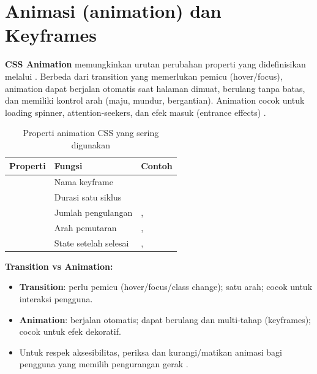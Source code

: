 ﻿\section{Animasi (animation) dan Keyframes}

\textbf{CSS Animation} memungkinkan urutan perubahan properti yang didefinisikan melalui . Berbeda dari transition yang memerlukan pemicu (hover/focus), animation dapat berjalan otomatis saat halaman dimuat, berulang tanpa batas, dan memiliki kontrol arah (maju, mundur, bergantian). Animation cocok untuk loading spinner, attention-seekers, dan efek masuk (entrance effects) \cite{mdnCss}.


\begin{table}[H]
\centering
\footnotesize
\setlength{\tabcolsep}{3pt}
\begin{tabular}{|P{5.8cm}|P{3.25cm}|P{3.25cm}|}
\hline
\textbf{Properti} & \textbf{Fungsi} & \textbf{Contoh} \\
\hline
{} & Nama keyframe &  \\
\hline
{} & Durasi satu siklus &  \\
\hline
{} & Jumlah pengulangan & ,  \\
\hline
{} & Arah pemutaran & ,  \\
\hline
{} & State setelah selesai & ,  \\
\hline
\end{tabular}
\caption{Properti animation CSS yang sering digunakan}
\end{table}

\begin{catatan}
\textbf{Transition vs Animation:}
\begin{itemize}
  \item \textbf{Transition}: perlu pemicu (hover/focus/class change); satu arah; cocok untuk interaksi pengguna.
  \item \textbf{Animation}: berjalan otomatis; dapat berulang dan multi-tahap (keyframes); cocok untuk efek dekoratif.
  \item Untuk respek aksesibilitas, periksa  dan kurangi/matikan animasi bagi pengguna yang memilih pengurangan gerak \cite{mdnAccessibility}.
\end{itemize}
\end{catatan}

